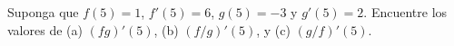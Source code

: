 \item Suponga que $f(5) = 1$, $f'(5) = 6$, $g(5) = -3$ y $g'(5) = 2$. Encuentre los valores de (a) $(fg)'(5)$, (b) $(f/g)'(5)$, y (c) $(g/f)'(5)$.
